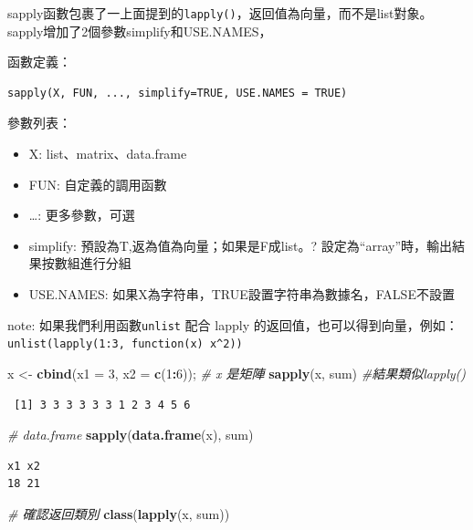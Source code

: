 \documentclass[]{book}
\newenvironment{Shaded}{\begin{snugshade}}{\end{snugshade}}
\newcommand{\CommentTok}[1]{\textcolor[rgb]{0.56,0.35,0.01}{\textit{#1}}}
\newcommand{\DataTypeTok}[1]{\textcolor[rgb]{0.13,0.29,0.53}{#1}}
\newcommand{\DecValTok}[1]{\textcolor[rgb]{0.00,0.00,0.81}{#1}}
\newcommand{\KeywordTok}[1]{\textcolor[rgb]{0.13,0.29,0.53}{\textbf{#1}}}
\newcommand{\NormalTok}[1]{#1}
\newcommand{\OperatorTok}[1]{\textcolor[rgb]{0.81,0.36,0.00}{\textbf{#1}}}
\newcommand{\StringTok}[1]{\textcolor[rgb]{0.31,0.60,0.02}{#1}}
\providecommand{\tightlist}{%
  \setlength{\itemsep}{0pt}\setlength{\parskip}{0pt}}
\theoremstyle{definition}
\theoremstyle{definition}
\theoremstyle{definition}
\theoremstyle{remark}
\begin{document}
sapply函數包裹了一上面提到的\texttt{lapply()}，返回值為向量，而不是list對象。sapply增加了2個參數simplify和USE.NAMES，

函數定義：

\begin{verbatim}
sapply(X, FUN, ..., simplify=TRUE, USE.NAMES = TRUE)
\end{verbatim}

參數列表：

\begin{itemize}
\tightlist
\item
  X: list、matrix、data.frame
\item
  FUN: 自定義的調用函數
\item
  \ldots{}: 更多參數，可選
\item
  simplify: 預設為T,返為值為向量；如果是F成list。?
  設定為``array''時，輸出結果按數組進行分組
\item
  USE.NAMES: 如果X為字符串，TRUE設置字符串為數據名，FALSE不設置
\end{itemize}

note: 如果我們利用函數\texttt{unlist} 配合 lapply
的返回值，也可以得到向量，例如：
\texttt{unlist(lapply(1:3,\ function(x)\ x\^{}2))}

\begin{Shaded}
\begin{Highlighting}[]
\NormalTok{x <-}\StringTok{ }\KeywordTok{cbind}\NormalTok{(}\DataTypeTok{x1 =} \DecValTok{3}\NormalTok{, }\DataTypeTok{x2 =} \KeywordTok{c}\NormalTok{(}\DecValTok{1}\OperatorTok{:}\DecValTok{6}\NormalTok{)); }\CommentTok{# x 是矩陣}
\KeywordTok{sapply}\NormalTok{(x, sum)  }\CommentTok{#結果類似lapply()}
\end{Highlighting}
\end{Shaded}

\begin{verbatim}
 [1] 3 3 3 3 3 3 1 2 3 4 5 6
\end{verbatim}

\begin{Shaded}
\begin{Highlighting}[]
\CommentTok{# data.frame}
\KeywordTok{sapply}\NormalTok{(}\KeywordTok{data.frame}\NormalTok{(x), sum)}
\end{Highlighting}
\end{Shaded}

\begin{verbatim}
x1 x2 
18 21 
\end{verbatim}

\begin{Shaded}
\begin{Highlighting}[]
\CommentTok{# 確認返回類別}
\KeywordTok{class}\NormalTok{(}\KeywordTok{lapply}\NormalTok{(x, sum))}
\end{Highlighting}
\end{Shaded}
\end{document}
